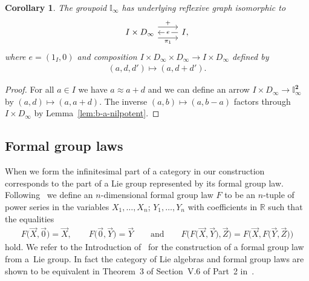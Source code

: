 \documentclass[pdftex]{sigma}
\numberwithin{equation}{section}
\newtheorem{Corollary}[Theorem]{Corollary}
\begin{document}
\begin{Corollary}\label{lem:A-path-is-trivial}
 The groupoid $\mathbb{I}_{\infty}$ has underlying reflexive graph isomorphic to
 \begin{equation*}\begin{tikzcd}
 I\times D_{\infty} \arrow[yshift=1.5ex]{r}{+} \rar[leftarrow][description]{e} \arrow[yshift=-1.5ex]{r}[swap]{\pi_{1}} & I,
 \end{tikzcd}\end{equation*}
 where $e=(1_{I},0)$ and composition $I\times D_{\infty}\times D_{\infty}\rightarrow I\times D_{\infty}$ defined by
 \begin{gather*}(a,d,d')\mapsto (a,d+d').\end{gather*}
\end{Corollary}

 \begin{proof} For all $a\in I$ we have $a\approx a+d$ and we can def\/ine an arrow $I\times D_{\infty} \rightarrow \mathbb{I}_{\infty}^{\mathbf 2}$ by $(a,d)\mapsto (a,a+d)$. The inverse $(a,b)\mapsto (a,b-a)$ factors through $I\times D_{\infty}$ by Lemma~\ref{lem:b-a-nilpotent}.
 \end{proof}

\subsection{Formal group laws}\label{sec:formal-group-laws}

When we form the inf\/initesimal part of a category in \cite{burke-relative-to-local-models} our construction corresponds to the part of a Lie group represented by its formal group law. Following~\cite{MR506881} we def\/ine an $n$-dimensional formal group law $F$ to be an $n$-tuple of power series in the variables $X_{1},\dots ,X_{n}$; $Y_{1},\dots ,Y_{n}$ with coef\/f\/icients in $\mathbb{R}$ such that the equalities
\begin{gather}
F\big(\vec{X},\vec{0}\big)=\vec{X},\qquad F\big(\vec{0},\vec{Y}\big)=\vec{Y}\qquad \text{and} \qquad F\big(F\big(\vec{X},\vec{Y}\big),\vec{Z}\big)=F\big(\vec{X},F\big(\vec{Y},\vec{Z}\big)\big)
\end{gather}
hold. We refer to the Introduction of~\cite{MR506881} for the construction of a formal group law from a~Lie group. In fact the category of Lie algebras and formal group laws are shown to be equivalent in Theorem~3 of Section~V.6 of Part~2 in~\cite{MR2179691}.
\end{document}
